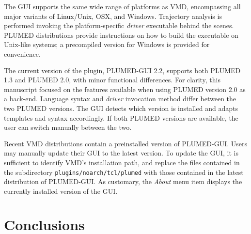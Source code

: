 \documentclass[preprint,review,11pt]{elsarticle}
\begin{document}
The GUI supports the same wide range of platforms as VMD, encompassing
all major variants of Linux/Unix, OSX, and Windows.  Trajectory
analysis is performed invoking the platform-specific \emph{driver}
executable behind the scenes. PLUMED distributions provide
instructions on how to build the executable on Unix-like systems; a
precompiled version for Windows is provided for convenience.

The current version of the plugin, PLUMED-GUI 2.2, supports both
PLUMED 1.3 and PLUMED 2.0, with minor functional differences.  For
clarity, this manuscript focused on the features available when using
PLUMED version 2.0 as a back-end.  Language syntax and \emph{driver}
invocation method differ between the two PLUMED versions.  The GUI
detects which version is installed and adapts templates and syntax
accordingly.  If both PLUMED versions are available, the user can
switch manually between the two.

Recent VMD distributions contain a preinstalled version of PLUMED-GUI.
Users may manually update their GUI to the latest version.  To update
the GUI, it is sufficient to identify VMD's installation path, and
replace the files contained in the subdirectory
\texttt{plugins/noarch/tcl/plumed} with those contained in the latest
distribution of PLUMED-GUI.  As customary, the \emph{About} menu item
displays the currently installed version of the GUI.


















\section{Conclusions}
\end{document}
